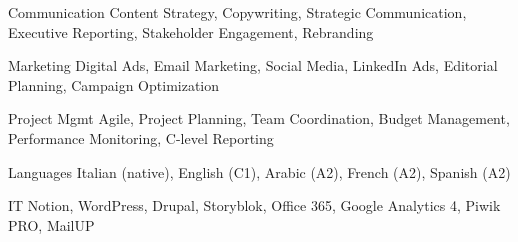 
\begin{cvskills}

\cvskill
{Communication} %
{Content Strategy, Copywriting, Strategic Communication, Executive Reporting, Stakeholder Engagement, Rebranding} %

\cvskill
{Marketing} %
{Digital Ads, Email Marketing, Social Media, LinkedIn Ads, Editorial Planning, Campaign Optimization} %

\cvskill
{Project Mgmt} %
{Agile, Project Planning, Team Coordination, Budget Management, Performance Monitoring, C-level Reporting} %

\cvskill
{Languages} %
{Italian (native), English (C1), Arabic (A2), French (A2), Spanish (A2)} %

\cvskill
{IT} %
{Notion, WordPress, Drupal, Storyblok, Office 365, Google Analytics 4, Piwik PRO, MailUP} %

\end{cvskills}
